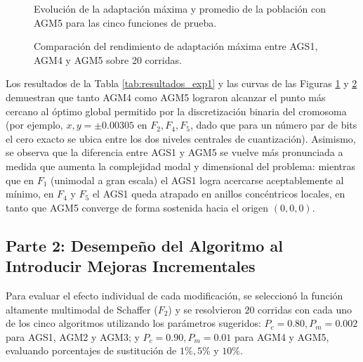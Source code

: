 \documentclass[11pt,letterpaper]{article}
\begin{document}
\begin{figure}[H]
    \centering
    \caption{Evolución de la adaptación máxima y promedio de la población con AGM5 para las cinco funciones de prueba.}
    \label{fig:exp1_agm5}
\end{figure}

\begin{figure}[H]
    \centering
    \caption{Comparación del rendimiento de adaptación máxima entre AGS1, AGM4 y AGM5 sobre 20 corridas.}
    \label{fig:exp1_comp}
\end{figure}

Los resultados de la Tabla \ref{tab:resultados_exp1} y las curvas de las Figuras \ref{fig:exp1_agm5} y \ref{fig:exp1_comp} demuestran que tanto AGM4 como AGM5 lograron alcanzar el punto más cercano al óptimo global permitido por la discretización binaria del cromosoma (por ejemplo, $x, y = \pm 0.00305$ en $F_2, F_4, F_5$, dado que para un número par de bits el cero exacto se ubica entre los dos niveles centrales de cuantización). Asimismo, se observa que la diferencia entre AGS1 y AGM5 se vuelve más pronunciada a medida que aumenta la complejidad modal y dimensional del problema: mientras que en $F_1$ (unimodal a gran escala) el AGS1 logra acercarse aceptablemente al mínimo, en $F_4$ y $F_5$ el AGS1 queda atrapado en anillos concéntricos locales, en tanto que AGM5 converge de forma sostenida hacia el origen $(0,0,0)$.

\subsection{Parte 2: Desempeño del Algoritmo al Introducir Mejoras Incrementales}
Para evaluar el efecto individual de cada modificación, se seleccionó la función altamente multimodal de Schaffer ($F_2$) y se resolvieron $20$ corridas con cada uno de los cinco algoritmos utilizando los parámetros sugeridos: $P_c = 0.80, P_m = 0.002$ para AGS1, AGM2 y AGM3; y $P_c = 0.90, P_m = 0.01$ para AGM4 y AGM5, evaluando porcentajes de sustitución de $1\%, 5\%$ y $10\%$.
\end{document}
